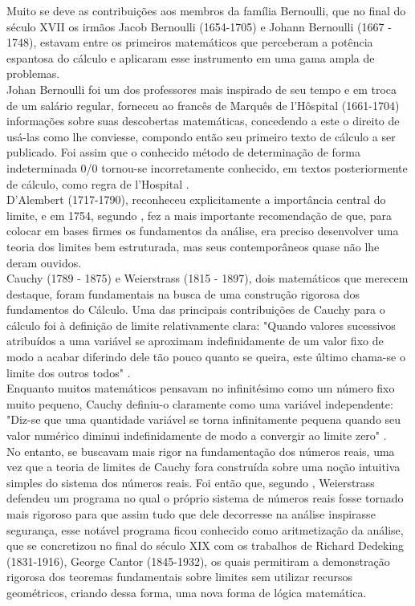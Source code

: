  Muito se deve as
contribuições aos membros da família Bernoulli, que no final do
século XVII os irmãos Jacob Bernoulli (1654-1705) e Johann Bernoulli
(1667 - 1748), estavam entre os primeiros matemáticos que perceberam
a potência espantosa do cálculo e aplicaram esse instrumento em uma
gama ampla de problemas.\\


 Johan Bernoulli foi um dos professores mais
inspirado de seu tempo e em troca de um salário regular, forneceu ao
francês de Marquês de l'Hôspital (1661-1704) informações sobre suas
descobertas matemáticas, concedendo a este o direito de usá-las como
lhe conviesse, compondo então seu primeiro texto de cálculo a ser
publicado. Foi assim que o conhecido método de determinação de forma
indeterminada 0/0 tornou-se incorretamente conhecido, em textos
posteriormente de cálculo, como regra de l'Hospital \cite{eves}.\\


D'Alembert (1717-1790), reconheceu explicitamente a importância
central do limite, e em 1754, segundo , fez a mais
importante recomendação de que, para colocar em bases firmes os
fundamentos da análise, era preciso desenvolver uma teoria dos
limites bem estruturada, mas seus contemporâneos quase não lhe deram
ouvidos.\\

Cauchy (1789 - 1875) e Weierstrass (1815 - 1897), dois matemáticos
que merecem destaque, foram fundamentais na busca de uma construção
rigorosa dos fundamentos do Cálculo. Uma das principais
contribuições de Cauchy para o cálculo foi à definição de limite
relativamente clara: "Quando valores sucessivos atribuídos a uma
variável se aproximam indefinidamente de um valor fixo de modo a
acabar diferindo dele tão pouco quanto se queira, este último
chama-se o limite dos outros todos" \cite[p.355]{boyer}.\\

 Enquanto muitos
matemáticos pensavam no infinitésimo como um número fixo muito
pequeno, Cauchy definiu-o claramente como uma variável independente:
"Diz-se que uma quantidade variável se torna infinitamente pequena
quando seu valor numérico diminui indefinidamente de modo a
convergir ao limite zero" \cite[p.355]{boyer}. \\



 No entanto, se buscavam
mais rigor na fundamentação dos números reais, uma vez que a teoria
de limites de Cauchy fora construída sobre uma noção intuitiva
simples do sistema dos números reais. Foi então que, segundo , Weierstrass defendeu um programa no qual o próprio sistema
de números reais fosse tornado mais rigoroso para que assim tudo que
dele decorresse na análise inspirasse segurança, esse notável
programa ficou conhecido como aritmetização da análise, que se
concretizou no final do século XIX com os trabalhos de Richard
Dedeking (1831-1916), George Cantor (1845-1932), os quais permitiram
a demonstração rigorosa dos teoremas fundamentais sobre limites sem
utilizar recursos geométricos, criando dessa forma, uma nova forma
de lógica matemática.\\


